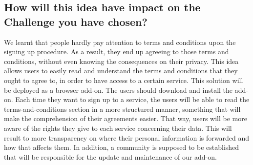 \subsection{How will this idea have impact on the Challenge you have chosen?}
We learnt that people hardly pay attention to terms and conditions upon the 
signing up procedure. As a result, they end up agreeing to those terms and 
conditions, without even knowing the consequences on their privacy. 
This idea allows users to easily read and understand the terms and conditions 
that they ought to agree to, in order to have access to a certain service.  
This solution will be deployed as a browser add-on. The users should download 
and install the add-on. Each time they want to sign up to a service, the users 
will be able to read the terms-and-conditions section in a more structured 
manner, something that will make the comprehension of their agreements easier. 
That way, users will be more aware of the rights they give to each service 
concerning their data. This will result to more transparency on where their 
personal information is forwarded and how that affects them. In addition, a 
community is supposed to be established that will be responsible for the update 
and maintenance of our add-on.  
